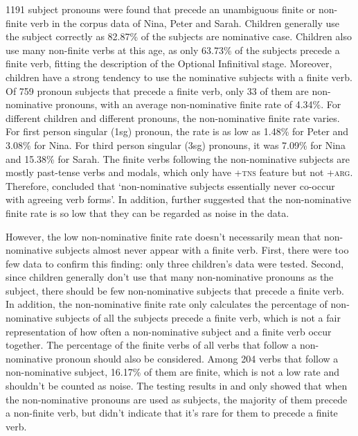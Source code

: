 1191 subject pronouns were found that precede an unambiguous finite or non-finite verb in the corpus data of Nina, Peter and Sarah. Children generally use the subject correctly as 82.87\% of the subjects are nominative case. Children also use many non-finite verbs at this age, as only 63.73\% of the subjects precede a finite verb, fitting the description of the Optional Infinitival stage. Moreover, children have a strong tendency to use the nominative subjects with a finite verb. Of 759 pronoun subjects that precede a finite verb, only 33 of them are non-nominative pronouns, with an average non-nominative finite rate of 4.34\%. For different children and different pronouns, the non-nominative finite rate varies. For first person singular (1sg) pronoun, the rate is as low as 1.48\% for Peter and 3.08\% for Nina. For third person singular (3sg) pronouns, it was 7.09\% for Nina and 15.38\% for Sarah. The finite verbs following the non-nominative subjects are mostly past-tense verbs and modals, which only have \textsc{+tns} feature but not \textsc{+arg}. Therefore, \cite{schutze1997} concluded that `non-nominative subjects essentially never co-occur with agreeing verb forms'. In addition, \cite{schutze2001} further suggested that the non-nominative finite rate is so low that they can be regarded as noise in the data. 

However, the low non-nominative finite rate doesn't necessarily mean that non-nominative subjects almost never appear with a finite verb. First, there were too few data to confirm this finding: only three children's data were tested. Second, since children generally don't use that many non-nominative pronouns as the subject, there should be few non-nominative subjects that precede a finite verb. In addition, the non-nominative finite rate only calculates the percentage of non-nominative subjects of all the subjects precede a finite verb, which is not a fair representation of how often a non-nominative subject and a finite verb occur together. The percentage of the finite verbs of all verbs that follow a non-nominative pronoun should also be considered. Among 204 verbs that follow a non-nominative subject, 16.17\% of them are finite, which is not a low rate and shouldn't be counted as noise. The testing results in \cite{schutze1996subject} and \cite{schutze1997} only showed that when the non-nominative pronouns are used as subjects, the majority of them precede a non-finite verb, but didn't indicate that it's rare for them to precede a finite verb. 


